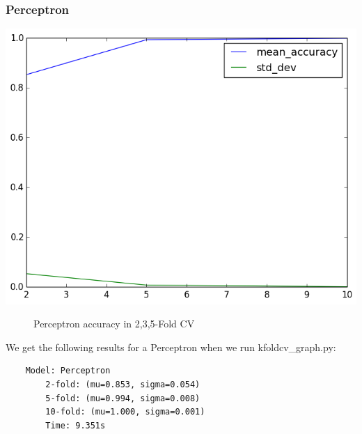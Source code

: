 \documentclass[fleqn]{article}
\begin{document}
    \subsubsection{Perceptron}
    \begin{center}
        \includegraphics[scale=0.35]{model_accuracy_vs_folds_Perceptron.png}
        \begin{figure}[!h]
            \caption{Perceptron accuracy in 2,3,5-Fold CV}
        \end{figure}
    \end{center}
    We get the following results for a Perceptron when we run kfoldcv\_graph.py:
    \begin{lstlisting}
    Model: Perceptron
        2-fold: (mu=0.853, sigma=0.054)
        5-fold: (mu=0.994, sigma=0.008)
        10-fold: (mu=1.000, sigma=0.001)
        Time: 9.351s
    \end{lstlisting}
\end{document}
